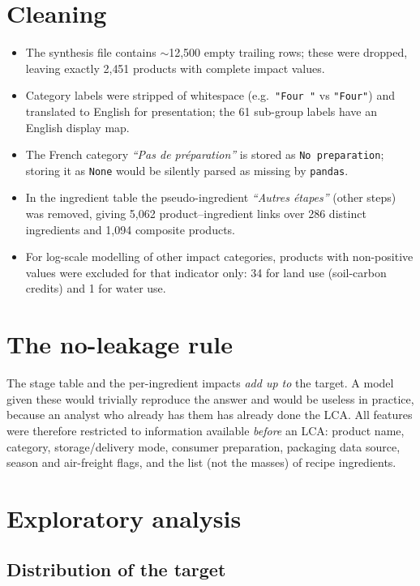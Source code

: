 \section{Cleaning}

\begin{itemize}
  \item The synthesis file contains $\sim$12{,}500 empty trailing rows; these were dropped,
        leaving exactly 2{,}451 products with complete impact values.
  \item Category labels were stripped of whitespace (e.g.\ \texttt{"Four "} vs \texttt{"Four"})
        and translated to English for presentation; the 61 sub-group labels have an
        English display map.
  \item The French category \emph{``Pas de préparation''} is stored as \texttt{No preparation};
        storing it as \texttt{None} would be silently parsed as missing by \texttt{pandas}.
  \item In the ingredient table the pseudo-ingredient \emph{``Autres étapes''} (other steps) was
        removed, giving 5{,}062 product--ingredient links over 286 distinct ingredients and
        1{,}094 composite products.
  \item For log-scale modelling of other impact categories, products with non-positive values
        were excluded for that indicator only: 34 for land use (soil-carbon credits) and 1 for
        water use.
\end{itemize}

\section{The no-leakage rule}

The stage table and the per-ingredient impacts \emph{add up to} the target. A model given these
would trivially reproduce the answer and would be useless in practice, because an analyst who
already has them has already done the LCA. All features were therefore restricted to information
available \emph{before} an LCA: product name, category, storage/delivery mode, consumer
preparation, packaging data source, season and air-freight flags, and the list (not the masses) of
recipe ingredients.

\section{Exploratory analysis}

\subsection{Distribution of the target}

